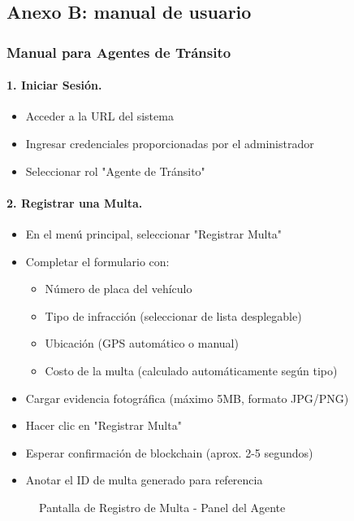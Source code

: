 \subsection{Anexo B: manual de usuario}

\subsubsection{Manual para Agentes de Tránsito}

\paragraph{1. Iniciar Sesión.}
\begin{itemize}
    \item Acceder a la URL del sistema
    \item Ingresar credenciales proporcionadas por el administrador
    \item Seleccionar rol "Agente de Tránsito"
\end{itemize}

\paragraph{2. Registrar una Multa.}
\begin{itemize}
    \item En el menú principal, seleccionar "Registrar Multa"
    \item Completar el formulario con:
    \begin{itemize}
        \item Número de placa del vehículo
        \item Tipo de infracción (seleccionar de lista desplegable)
        \item Ubicación (GPS automático o manual)
        \item Costo de la multa (calculado automáticamente según tipo)
    \end{itemize}
    \item Cargar evidencia fotográfica (máximo 5MB, formato JPG/PNG)
    \item Hacer clic en "Registrar Multa"
    \item Esperar confirmación de blockchain (aprox. 2-5 segundos)
    \item Anotar el ID de multa generado para referencia
\end{itemize}

\begin{figure}[htbp]
    \centering
    \caption{Pantalla de Registro de Multa - Panel del Agente}
\end{figure}

